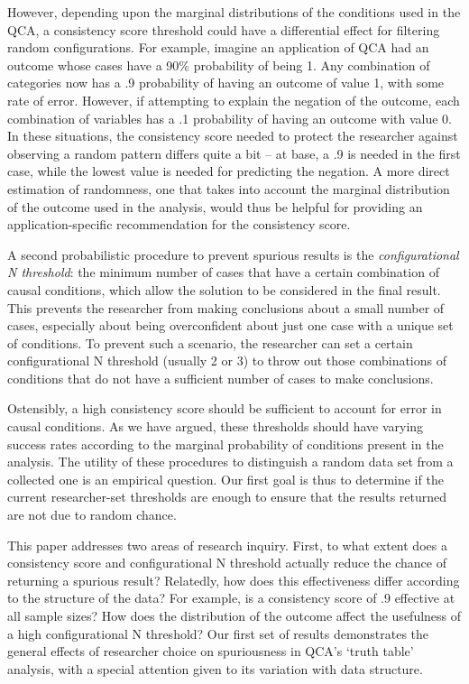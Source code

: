 \documentclass[]{article}
\begin{document}
{However, depending upon the marginal distributions of the conditions used in the QCA, a consistency score threshold could have a differential effect for filtering random configurations. For example, imagine an application of QCA had an outcome whose cases have a 90\% probability of being 1. Any combination of categories now has a .9 probability of having an outcome of value 1, with some rate of error. However, if attempting to explain the negation of the outcome, each combination of variables has a .1 probability of having an outcome with value 0. In these situations, the consistency score needed to protect the researcher against observing a random pattern differs quite a bit -- at base, a .9 is needed in the first case, while the lowest value is needed for predicting the negation. A more direct estimation of randomness, one that takes into account the marginal distribution of the outcome used in the analysis, would thus be helpful for providing an application-specific recommendation for the consistency score. 

A second probabilistic procedure to prevent spurious results is the {\it{configurational N threshold}}:  the minimum number of cases that have a certain combination of causal conditions, which allow the solution to be considered in the final result. This prevents the researcher from making conclusions about a small number of cases, especially about being overconfident about just one case with a unique set of conditions. To prevent such a scenario, the researcher can set a certain configurational N threshold (usually 2 or 3) to throw out those combinations of conditions that do not have a sufficient number of cases to make conclusions. 

Ostensibly, a high consistency score should be sufficient to account for error in causal conditions. As we have argued, these thresholds should have varying success rates according to the marginal probability of conditions present in the analysis. The utility of these procedures to distinguish a random data set from a collected one is an empirical question. Our first goal is thus to determine if the current researcher-set thresholds are enough to ensure that the results returned are not due to random chance. 

This paper addresses two areas of research inquiry. First, to what extent does a consistency score and configurational N threshold actually reduce the chance of returning a spurious result? Relatedly, how does this effectiveness differ according to the structure of the data? For example, is a consistency score of .9 effective at all sample sizes? How does the distribution of the outcome affect the usefulness of a high configurational N threshold? Our first set of results demonstrates the general effects of researcher choice on spuriousness in QCA's `truth table' analysis, with a special attention given to its variation with data structure. 

}
\end{document}
